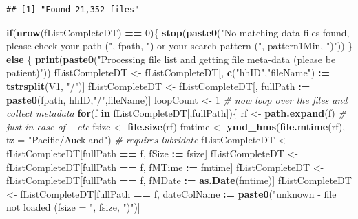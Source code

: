 \documentclass[]{article}
\newenvironment{Shaded}{\begin{snugshade}}{\end{snugshade}}
\newcommand{\KeywordTok}[1]{\textcolor[rgb]{0.13,0.29,0.53}{\textbf{#1}}}
\newcommand{\DataTypeTok}[1]{\textcolor[rgb]{0.13,0.29,0.53}{#1}}
\newcommand{\DecValTok}[1]{\textcolor[rgb]{0.00,0.00,0.81}{#1}}
\newcommand{\StringTok}[1]{\textcolor[rgb]{0.31,0.60,0.02}{#1}}
\newcommand{\CommentTok}[1]{\textcolor[rgb]{0.56,0.35,0.01}{\textit{#1}}}
\newcommand{\ControlFlowTok}[1]{\textcolor[rgb]{0.13,0.29,0.53}{\textbf{#1}}}
\newcommand{\OperatorTok}[1]{\textcolor[rgb]{0.81,0.36,0.00}{\textbf{#1}}}
\newcommand{\ErrorTok}[1]{\textcolor[rgb]{0.64,0.00,0.00}{\textbf{#1}}}
\newcommand{\NormalTok}[1]{#1}
\begin{document}
\begin{verbatim}
## [1] "Found 21,352 files"
\end{verbatim}

\begin{Shaded}
\begin{Highlighting}[]
\ControlFlowTok{if}\NormalTok{(}\KeywordTok{nrow}\NormalTok{(fListCompleteDT) }\OperatorTok{==}\StringTok{ }\DecValTok{0}\NormalTok{)\{}
  \KeywordTok{stop}\NormalTok{(}\KeywordTok{paste0}\NormalTok{(}\StringTok{"No matching data files found, please check your path ("}\NormalTok{, fpath, }\StringTok{") or your search pattern ("}\NormalTok{, pattern1Min, }\StringTok{")"}\NormalTok{))}
\NormalTok{\} }\ControlFlowTok{else}\NormalTok{ \{}
  \KeywordTok{print}\NormalTok{(}\KeywordTok{paste0}\NormalTok{(}\StringTok{"Processing file list and getting file meta-data (please be patient)"}\NormalTok{))}
\NormalTok{  fListCompleteDT <-}\StringTok{ }\NormalTok{fListCompleteDT[, }\KeywordTok{c}\NormalTok{(}\StringTok{"hhID"}\NormalTok{,}\StringTok{"fileName"}\NormalTok{) }\OperatorTok{:}\ErrorTok{=}\StringTok{ }\KeywordTok{tstrsplit}\NormalTok{(V1, }\StringTok{"/"}\NormalTok{)]}
\NormalTok{  fListCompleteDT <-}\StringTok{ }\NormalTok{fListCompleteDT[, fullPath }\OperatorTok{:}\ErrorTok{=}\StringTok{ }\KeywordTok{paste0}\NormalTok{(fpath, hhID,}\StringTok{"/"}\NormalTok{,fileName)]}
\NormalTok{  loopCount <-}\StringTok{ }\DecValTok{1}
  \CommentTok{# now loop over the files and collect metadata}
  \ControlFlowTok{for}\NormalTok{(f }\ControlFlowTok{in}\NormalTok{ fListCompleteDT[,fullPath])\{}
\NormalTok{    rf <-}\StringTok{ }\KeywordTok{path.expand}\NormalTok{(f) }\CommentTok{# just in case of ~ etc}
\NormalTok{    fsize <-}\StringTok{ }\KeywordTok{file.size}\NormalTok{(rf)}
\NormalTok{    fmtime <-}\StringTok{ }\KeywordTok{ymd_hms}\NormalTok{(}\KeywordTok{file.mtime}\NormalTok{(rf), }\DataTypeTok{tz =} \StringTok{"Pacific/Auckland"}\NormalTok{) }\CommentTok{# requires lubridate}
\NormalTok{    fListCompleteDT <-}\StringTok{ }\NormalTok{fListCompleteDT[fullPath }\OperatorTok{==}\StringTok{ }\NormalTok{f, fSize }\OperatorTok{:}\ErrorTok{=}\StringTok{ }\NormalTok{fsize]}
\NormalTok{    fListCompleteDT <-}\StringTok{ }\NormalTok{fListCompleteDT[fullPath }\OperatorTok{==}\StringTok{ }\NormalTok{f, fMTime }\OperatorTok{:}\ErrorTok{=}\StringTok{ }\NormalTok{fmtime]}
\NormalTok{    fListCompleteDT <-}\StringTok{ }\NormalTok{fListCompleteDT[fullPath }\OperatorTok{==}\StringTok{ }\NormalTok{f, fMDate }\OperatorTok{:}\ErrorTok{=}\StringTok{ }\KeywordTok{as.Date}\NormalTok{(fmtime)]}
\NormalTok{    fListCompleteDT <-}\StringTok{ }\NormalTok{fListCompleteDT[fullPath }\OperatorTok{==}\StringTok{ }\NormalTok{f, dateColName }\OperatorTok{:}\ErrorTok{=}\StringTok{ }\KeywordTok{paste0}\NormalTok{(}\StringTok{"unknown - file not loaded (fsize = "}\NormalTok{, fsize, }\StringTok{")"}\NormalTok{)]}

\end{Highlighting}
\end{Shaded}
\end{document}
